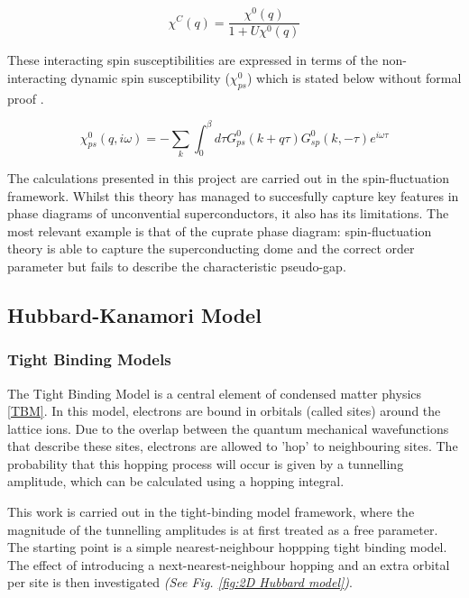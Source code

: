 \documentclass[12pt]{article}
\begin{document}
\begin{equation}
    \chi^C(q) = \frac{\chi^0(q)}{1 + U \chi^0 (q)}
\end{equation}

\noindent These interacting spin susceptibilities are expressed in terms of the non-interacting dynamic spin susceptibility ($\chi_{ps}^0$) which is stated below without formal proof \cite{moriya2000spin}. 

\begin{equation}\label{chi 0}
    \chi_{ps}^0(q, i \omega) = -\sum_{k} \int_{0}^{\beta} d\tau G^0_{ps}(k+q \tau) G^0_{sp}(k, -\tau)e^{i\omega \tau}
\end{equation} 

\noindent The calculations presented in this project are carried out in the spin-fluctuation framework. 
Whilst this theory has managed to succesfully capture key features in phase diagrams of unconvential superconductors, it also has its limitations.
The most relevant example is that of the cuprate phase diagram:
spin-fluctuation theory is able to capture the superconducting dome and the correct order parameter \cite{moriya2006developments, scalapino1995case} 
but fails
to describe the characteristic pseudo-gap\cite{timusk1999pseudogap}. 

\subsection{Hubbard-Kanamori Model}

\subsubsection{Tight Binding Models}

The Tight Binding Model is a central element of condensed matter physics \eqref{TBM}. In this model, electrons are bound in orbitals (called sites) around the lattice ions.
Due to the overlap between the quantum mechanical wavefunctions that describe these sites, electrons are allowed to 'hop' to neighbouring sites. The probability that this hopping process will occur is given by a tunnelling amplitude, which can be calculated using a hopping integral. \par
\medskip
\noindent This work is carried out in the tight-binding model framework, where the magnitude of the tunnelling amplitudes is at first treated as a free parameter. 
The starting point is a simple nearest-neighbour hoppping tight binding model. 
The effect of introducing a next-nearest-neighbour hopping and an extra orbital per site
is then investigated \textit{(See Fig. \ref{fig:2D Hubbard model})}.
\end{document}
